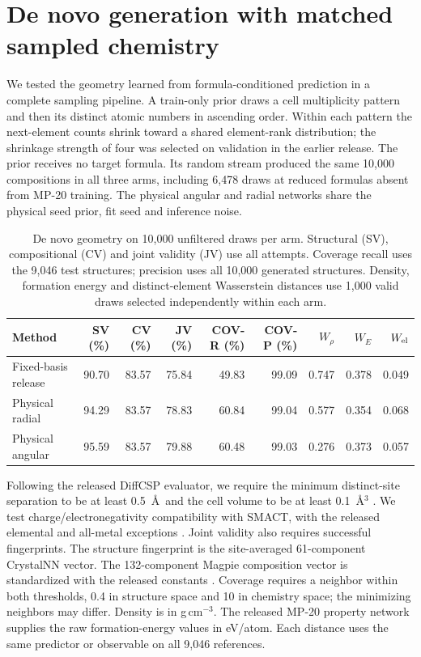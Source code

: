 \section{De novo generation with matched sampled chemistry}\label{sec:denovo}
We tested the geometry learned from formula-conditioned prediction in a complete sampling pipeline. A train-only prior draws a cell multiplicity pattern and then its distinct atomic numbers in ascending order. Within each pattern the next-element counts shrink toward a shared element-rank distribution; the shrinkage strength of four was selected on validation in the earlier release. The prior receives no target formula. Its random stream produced the same 10,000 compositions in all three arms, including 6,478 draws at reduced formulas absent from MP-20 training. The physical angular and radial networks share the physical seed prior, fit seed and inference noise.
\begin{table}[!htbp]\centering\small\setlength{\tabcolsep}{3.8pt}
\caption{De novo geometry on 10,000 unfiltered draws per arm. Structural (SV), compositional (CV) and joint validity (JV) use all attempts. Coverage recall uses the 9,046 test structures; precision uses all 10,000 generated structures. Density, formation energy and distinct-element Wasserstein distances use 1,000 valid draws selected independently within each arm.}\label{tab:new-raw}
\begin{tabular}{lrrrrrrrr}\hline Method & SV (\%) & CV (\%) & JV (\%) & COV-R (\%) & COV-P (\%) & $W_\rho$ & $W_E$ & $W_{\rm el}$\\\hline
Fixed-basis release & 90.70 & 83.57 & 75.84 & 49.83 & 99.09 & 0.747 & 0.378 & 0.049\\
Physical radial & 94.29 & 83.57 & 78.83 & 60.84 & 99.04 & 0.577 & 0.354 & 0.068\\
Physical angular & 95.59 & 83.57 & 79.88 & 60.48 & 99.03 & 0.276 & 0.373 & 0.057\\
\hline\end{tabular}\end{table}
Following the released DiffCSP evaluator, we require the minimum distinct-site separation to be at least 0.5~\AA\ and the cell volume to be at least 0.1~\AA$^3$ \cite{diffcsp}. We test charge/electronegativity compatibility with SMACT, with the released elemental and all-metal exceptions \cite{smact}. Joint validity also requires successful fingerprints. The structure fingerprint is the site-averaged 61-component CrystalNN vector. The 132-component Magpie composition vector is standardized with the released constants \cite{matminer}. Coverage requires a neighbor within both thresholds, 0.4 in structure space and 10 in chemistry space; the minimizing neighbors may differ. Density is in g\,cm$^{-3}$. The released MP-20 property network supplies the raw formation-energy values in eV/atom. Each distance uses the same predictor or observable on all 9,046 references.
